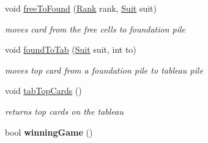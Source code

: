 \begin{DoxyCompactItemize}
void \hyperlink{class_setup_a109a5ee4d601011d72fe167c1acff07d}{free\+To\+Found} (\hyperlink{_card_a_d_t_8h_adf74d53cd68bbef55ba510b266ecbbed}{Rank} rank, \hyperlink{_card_a_d_t_8h_af78e1c8ea5e6837b6ab9452a1e435e4e}{Suit} suit)
\begin{DoxyCompactList}\small\item\em moves card from the free cells to foundation pile \end{DoxyCompactList}\item 
void \hyperlink{class_setup_a007aa7746a094ad3c435ded096dcfae5}{found\+To\+Tab} (\hyperlink{_card_a_d_t_8h_af78e1c8ea5e6837b6ab9452a1e435e4e}{Suit} suit, int to)
\begin{DoxyCompactList}\small\item\em moves top card from a foundation pile to tableau pile \end{DoxyCompactList}\item 
void \hyperlink{class_setup_a40e6d6ec8ee33bc01fef4a2a7367e218}{tab\+Top\+Cards} ()\hypertarget{class_setup_a40e6d6ec8ee33bc01fef4a2a7367e218}{}\label{class_setup_a40e6d6ec8ee33bc01fef4a2a7367e218}

\begin{DoxyCompactList}\small\item\em returns top cards on the tableau \end{DoxyCompactList}\item 
bool {\bfseries winning\+Game} ()\hypertarget{class_setup_a697c8770b52364a00510cd8fb8520ab5}{}\label{class_setup_a697c8770b52364a00510cd8fb8520ab5}

\end{DoxyCompactItemize}
